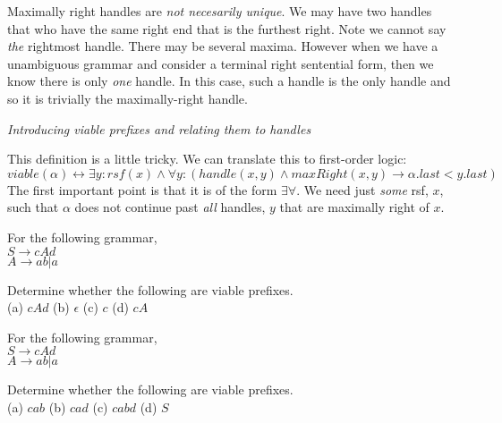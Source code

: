 
Maximally right handles are \textit{not necesarily unique}. We may have 
two handles that who have the same right end that is the furthest right.  
Note we cannot say \textit{the} rightmost handle. There may be several maxima. 
However when we have a unambiguous grammar and consider a terminal right sentential form, 
then we know there is only \textit{one} handle. In this case, such a handle 
is the only handle and so it is trivially the maximally-right handle.

\frmrule 

\textit{Introducing viable prefixes and relating them to handles }



This definition is a little tricky. We can translate this to first-order logic: 
$$viable(\alpha) \leftrightarrow \exists y: rsf(x) \wedge \forall y: (handle(x,y) \wedge maxRight(x,y) \rightarrow \alpha.last < y.last)$$
The first important point is that it is of the form $\exists\forall$. 
We need just \textit{some} rsf, $x$, such that $\alpha$ does not continue past \textit{all} handles, $y$
that are maximally right of $x$. 


\frmrule 

\begin{example}
For the following grammar,\\
$S \rightarrow cAd$\\
$A \rightarrow ab | a$

Determine whether the following are viable prefixes. \\
(a) $cAd$ (b) $\epsilon$ (c) $c$ (d) $cA$
\end{example}

\frmrule 

\begin{example}
For the following grammar,\\
$S \rightarrow cAd$\\
$A \rightarrow ab | a$

Determine whether the following are viable prefixes. \\
(a) $cab$ (b) $cad$ (c) $cabd$ (d) $S$
\end{example}



